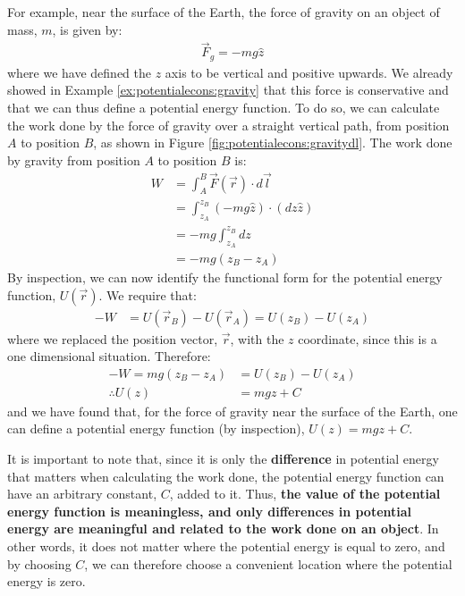For example, near the surface of the Earth, the force of gravity on an object of mass, $m$, is given by:
\begin{align*}
\vec F_g = -mg \hat z
\end{align*}
where we have defined the $z$ axis to be vertical and positive upwards. We already showed in Example \ref{ex:potentialecons:gravity} that this force is conservative and that we can thus define a potential energy function. To do so, we can calculate the work done by the force of gravity over a straight vertical path, from position $A$ to position $B$, as shown in Figure \ref{fig:potentialecons:gravitydl}.
The work done by gravity from position $A$ to position $B$ is:
\begin{align*}
W &= \int_A^B \vec F(\vec r) \cdot d\vec l\\
&= \int_{z_A}^{z_B} ( -mg \hat z) \cdot (dz \hat z) \\
&= -mg \int_{z_A}^{z_B} dz\\
&= -mg(z_B-z_A) 
\end{align*} 
By inspection, we can now identify the functional form for the potential energy function, $U(\vec r)$. We require that:
\begin{align*}
-W &= U(\vec r_B) - U(\vec r_A) = U(z_B) - U(z_A)
\end{align*}
where we replaced the position vector, $\vec r$, with the $z$ coordinate, since this is a one dimensional situation. Therefore:
\begin{align*}
-W=mg(z_B-z_A)&= U(z_B) - U(z_A)\\
\therefore U(z) &= mgz + C
\end{align*} 
and we have found that, for the force of gravity near the surface of the Earth, one can define a potential energy function (by inspection), $U(z) = mgz +C$.

It is important to note that, since it is only the \textbf{difference} in potential energy that matters when calculating the work done, the potential energy function can have an arbitrary constant, $C$, added to it. Thus, \textbf{the value of the potential energy function is meaningless, and only differences in potential energy are meaningful and related to the work done on an object}. In other words, it does not matter where the potential energy is equal to zero, and by choosing $C$, we can therefore choose a convenient location where the potential energy is zero.

